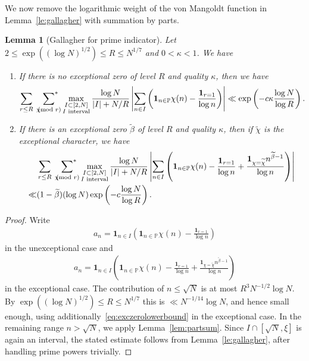 \documentclass[12pt]{amsart}
\newtheorem{lemma}[theorem]{Lemma}
\theoremstyle{definition}
\theoremstyle{remark}
\numberwithin{equation}{section}
\newcommand{\asum}{\sideset{}{^{\ast}}\sum}
\newcommand{\1}{\mathbf{1}}
\let\oldpmod\pmod
\renewcommand{\pmod}[1]{\hspace{-0.12cm}\oldpmod {#1}}
\begin{document}
We now remove the logarithmic weight of the von Mangoldt function in Lemma~\ref{le:gallagher} with summation by parts.

\begin{lemma}[Gallagher for prime indicator]\label{le:gallagherprime}
 Let $2\leq \exp((\log N)^{1/2}) \leq R \leq N^{1/7}$ and $0<\kappa<1$. We have
    \begin{enumerate}
		\item  If there is no exceptional zero of level $R$ and quality $\kappa$, then we have
		  \begin{align*}
		  \sum_{ r\leq R}\,\,\,\asum_{\chi\pmod r} \max_{\substack{I\subset [2,N]\\I \textnormal{ interval}}}\frac{\log N}{|I|+N/R}\left|\sum_{n\in I}\left(\1_{n\in \mathbb{P}}\chi(n)-\frac{\1_{r=1}}{\log n}\right)\right|\ll \exp\left(-c\kappa \frac{\log N}{\log R}\right).
	       \end{align*}
		\item  If there is an exceptional zero $\widetilde{\beta}$ of level $R$ and quality $\kappa$, then if $\widetilde{\chi}$ is the exceptional character, we have
            \begin{align*}
			    &\sum_{ r\leq R}\,\,\,\asum_{\chi\pmod r}\max_{\substack{I\subset [2,N]\\I \textnormal{ interval}}}\frac{\log N}{|I|+N/R} \left|\sum_{n\in I}\left(\1_{n\in \mathbb{P}}\chi(n)-\frac{\1_{r=1}}{\log n}+\frac{\1_{\chi=\widetilde{\chi}}n^{\widetilde{\beta}-1}}{\log n}\right)\right|\\
                \ll& (1-\widetilde{\beta})(\log N)\exp\left(-c \frac{\log N}{\log R}\right).
		    \end{align*}
	   \end{enumerate}
\end{lemma}

\begin{proof}
Write 
\begin{align*}
    a_n=\1_{n\in I}\left(\1_{n\in \mathbb{P}}\chi(n)-\frac{\1_{r=1}}{\log n}\right)
\end{align*}
in the unexceptional case and 
\begin{align*}
    a_n=\1_{n\in I}\left(\1_{n\in \mathbb{P}}\chi(n)-\frac{\1_{r=1}}{\log n}+\frac{\1_{\chi=\widetilde{\chi}}n^{\widetilde{\beta}-1}}{\log n}\right)
\end{align*}
in the exceptional case. The contribution of $n\leq \sqrt{N}$ is at most $R^3 N^{-1/2} \log N$. By $\exp((\log N)^{1/2}) \leq R \leq N^{1/7}$ this is $\ll N^{-1/14}\log N$, and hence small enough, using additionally~\eqref{eq:exczerolowerbound} in the exceptional case.
In the remaining range $n>\sqrt{N}$, we apply Lemma~\ref{lem:partsum}. Since $I\cap [\sqrt{N},\xi]$ is again an interval, the stated estimate follows from Lemma~\ref{le:gallagher}, after handling prime powers trivially.
\end{proof}
\end{document}

